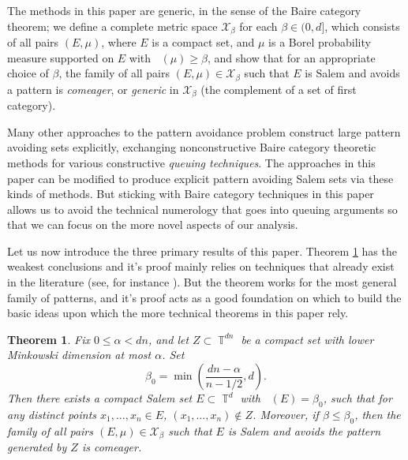 \documentclass[dvipsnames,letterpaper,12pt]{article}
\numberwithin{equation}{section}
\DeclareMathOperator{\fordim}{\dim_{\mathbb{F}}}
\DeclareMathOperator{\TT}{\mathbb{T}}
\newtheorem{theorem}{Theorem}
\numberwithin{theorem}{section}
\begin{document}
The methods in this paper are generic, in the sense of the Baire category theorem; we define a complete metric space $\mathcal{X}_\beta$ for each $\beta \in (0,d]$, which consists of all pairs $(E,\mu)$, where $E$ is a compact set, and $\mu$ is a Borel probability measure supported on $E$ with $\fordim(\mu) \geq \beta$, and show that for an appropriate choice of $\beta$, the family of all pairs $(E,\mu) \in \mathcal{X}_\beta$ such that $E$ is Salem and avoids a pattern is \emph{comeager}, or \emph{generic} in $\mathcal{X}_\beta$ (the complement of a set of first category).

Many other approaches \cite{Keleti,PramanikFraser,OurPaper} to the pattern avoidance problem construct large pattern avoiding sets explicitly, exchanging nonconstructive Baire category theoretic methods for various constructive \emph{queuing techniques}. The approaches in this paper can be modified to produce explicit pattern avoiding Salem sets via these kinds of methods. But sticking with Baire category techniques in this paper allows us to avoid the technical numerology that goes into queuing arguments so that we can focus on the more novel aspects of our analysis.



Let us now introduce the three primary results of this paper. Theorem \ref{maintheorem} has the weakest conclusions and it's proof mainly relies on techniques that already exist in the literature (see, for instance \cite{Korner1}). But the theorem works for the most general family of patterns, and it's proof acts as a good foundation on which to build the basic ideas upon which the more technical theorems in this paper rely.

\begin{theorem} \label{maintheorem}
    Fix $0 \leq \alpha < dn$, and let $Z \subset \TT^{dn}$ be a compact set with lower Minkowski dimension at most $\alpha$. Set
    \[ \beta_0 = \min \left( \frac{dn - \alpha}{n-1/2}, d \right). \]
    Then there exists a compact Salem set $E \subset \TT^d$ with $\fordim(E) = \beta_0$, such that for any distinct points $x_1, \dots, x_n \in E$, $(x_1, \dots, x_n) \not \in Z$. Moreover, if $\beta \leq \beta_0$, then the family of all pairs $(E,\mu) \in \mathcal{X}_\beta$ such that $E$ is Salem and avoids the pattern generated by $Z$ is comeager.
\end{theorem}
\end{document}
